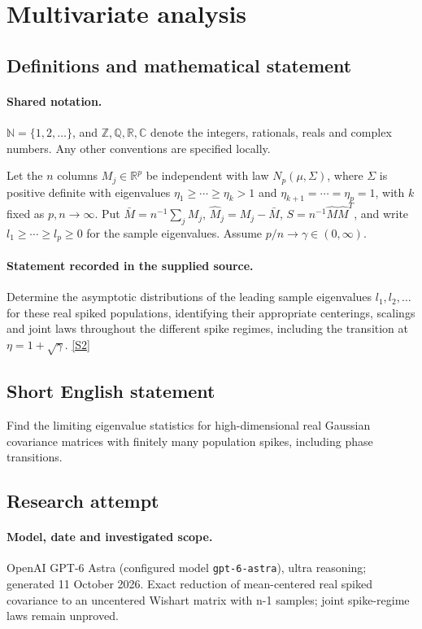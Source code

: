 \documentclass[11pt]{article}
\newcommand{\sref}[2]{\hyperlink{source:#1:#2}{[S#2]}}
\begin{document}
\section{Multivariate analysis}\label{statement}

\subsection{Definitions and mathematical statement}

\paragraph{Shared notation.}$\mathbb N=\{1,2,\ldots\}$, and $\mathbb Z,\mathbb Q,\mathbb R,\mathbb C$ denote the integers, rationals, reals and complex numbers. Any other conventions are specified locally.


Let the $n$ columns $M_j\in\mathbb R^p$ be independent with law $N_p(\mu,\Sigma)$, where $\Sigma$ is positive definite with eigenvalues $\eta_1\ge\cdots\ge\eta_k>1$ and $\eta_{k+1}=\cdots=\eta_p=1$, with $k$ fixed as $p,n\to\infty$. Put $\bar M=n^{-1}\sum_j M_j$, $\widehat M_j=M_j-\bar M$, $S=n^{-1}\widehat M\widehat M^T$, and write $l_1\ge\cdots\ge l_p\ge0$ for the sample eigenvalues. Assume $p/n\to\gamma\in(0,\infty)$.
\paragraph{Statement recorded in the supplied source.}
Determine the asymptotic distributions of the leading sample eigenvalues $l_1,l_2,\ldots$ for these real spiked populations, identifying their appropriate centerings, scalings and joint laws throughout the different spike regimes, including the transition at $\eta=1+\sqrt\gamma$. \sref{statement}{2}
\subsection{Short English statement}
Find the limiting eigenvalue statistics for high-dimensional real Gaussian covariance matrices with finitely many population spikes, including phase transitions.
\subsection{Research attempt}
\paragraph{Model, date and investigated scope.}
OpenAI GPT-6 Astra (configured model \texttt{gpt-6-astra}), ultra reasoning; generated 11 October 2026. Exact reduction of mean-centered real spiked covariance to an uncentered Wishart matrix with n-1 samples; joint spike-regime laws remain unproved.
\end{document}
